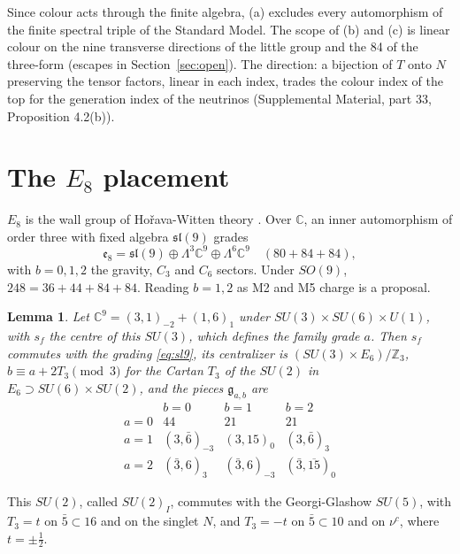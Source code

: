 \documentclass[aps,prd,reprint,onecolumn,nofootinbib,amsmath,amssymb,floatfix]{revtex4-2}
\theoremstyle{plain}
\newtheorem{lemma}[theorem]{Lemma}
\newcommand{\C}{\mathbb C}
\newcommand{\supp}[1]{Supplemental Material, part #1}
\begin{document}
Since colour acts through the finite algebra, (a) excludes every automorphism of the finite spectral triple of the Standard Model. The scope of (b) and (c) is linear colour on the nine transverse directions of the little group and the 84 of the three-form (escapes in Section~\ref{sec:open}). The direction: a bijection of $T$ onto $N$ preserving the tensor factors, linear in each index, trades the colour index of the top for the generation index of the neutrinos (\supp{33}, Proposition 4.2(b)).

\section{The \texorpdfstring{$E_8$}{E8} placement}\label{sec:e8}

$E_8$ is the wall group of Ho\v{r}ava-Witten theory \cite{HW1996}. Over $\C$, an inner automorphism of order three with fixed algebra $\mathfrak{sl}(9)$ grades
\begin{equation}\label{eq:sl9}
\mathfrak e_8=\mathfrak{sl}(9)\oplus\Lambda^3\C^9\oplus\Lambda^6\C^9\quad(80+84+84),
\end{equation}
with $b=0,1,2$ the gravity, $C_3$ and $C_6$ sectors. Under $SO(9)$, $248=36+44+84+84$. Reading $b=1,2$ as M2 and M5 charge is a proposal.

\begin{lemma}\label{lem:grades}
Let $\C^9=(3,1)_{-2}+(1,6)_1$ under $SU(3)\times SU(6)\times U(1)$, with $s_f$ the centre of this $SU(3)$, which defines the family grade $a$. Then $s_f$ commutes with the grading \eqref{eq:sl9}, its centralizer is $(SU(3)\times E_6)/\mathbb Z_3$, $b\equiv a+2T_3\pmod3$ for the Cartan $T_3$ of the $SU(2)$ in $E_6\supset SU(6)\times SU(2)$, and the pieces $\mathfrak g_{a,b}$ are
\begin{equation}\label{eq:table}
\begin{array}{c|ccc}
&b=0&b=1&b=2\\\hline
a=0&44&21&21\\
a=1&(3,\bar6)_{-3}&(3,15)_0&(3,\bar6)_3\\
a=2&(\bar3,6)_3&(\bar3,6)_{-3}&(\bar3,\overline{15})_0
\end{array}
\end{equation}
\end{lemma}

This $SU(2)$, called $SU(2)_I$, commutes with the Georgi-Glashow $SU(5)$, with $T_3=t$ on $\bar5\subset16$ and on the singlet $N$, and $T_3=-t$ on $\bar5\subset10$ and on $\nu^c$, where $t=\pm\frac12$.
\end{document}
